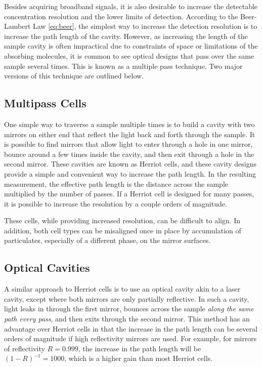 Besides acquiring broadband signals, it is also desirable to increase the
detectable concentration resolution and the lower limits of detection.
According to the Beer-Lambert Law \eqref{eq:beer}, the simplest way to increase
the detection resolution is to increase the path length of the cavity. However,
as increasing the length of the sample cavity is often impractical due to
constraints of space or limitations of the absorbing molecules, it is common to
see optical designs that pass over the same sample several times. This is known
as a multiple pass technique. Two major versions of this technique are outlined
below.

\subsection{Multipass Cells}

One simple way to traverse a sample multiple times is to build a cavity with
two mirrors on either end that reflect the light back and forth through the
sample. It is possible to find mirrors that allow light to enter through a hole
in one mirror, bounce around a few times inside the cavity, and then exit
through a hole in the second mirror. These cavities are known as
Herriot cells, and these cavity designs provide a simple and convenient way to
increase the path length. In the resulting measurement, the effective path
length is the distance across the sample multiplied by the number of passes. If
a Herriot cell is designed for many passes, it is possible to increase
the resolution by a couple orders of magnitude.

These cells, while providing increased resolution, can be difficult to align.
In addition, both cell types can be misaligned once in place by accumulation of
particulates, especially of a different phase, on the mirror surfaces.

\subsection{Optical Cavities}

A similar approach to  Herriot cells is to use an optical cavity akin
to a laser cavity, except where both mirrors are only partially reflective. In
such a cavity, light leaks in through the first mirror, bounces across the
sample \emph{along the same path every pass}, and then exits through the second
mirror. This method has an advantage over  Herriot cells in that the
increase in the path length can be several orders of magnitude if high
reflectivity mirrors are used. For example, for mirrors of reflectivity
$R=0.999$, the increase in the path length will be $(1-R)^{-1} = 1000$, which
is a higher gain than most  Herriot cells.


